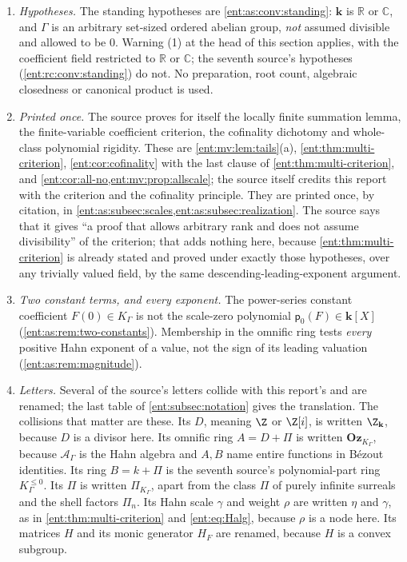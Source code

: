\documentclass[11pt]{article}
\theoremstyle{plain}
\theoremstyle{plain}
\theoremstyle{plain}
\theoremstyle{definition}
\theoremstyle{definition}
\theoremstyle{definition}
\theoremstyle{definition}
\theoremstyle{remark}
\newcommand{\C}{\mathbb C}\newcommand{\R}{\mathbb R}
\newcommand{\K}{K_\Gamma}\newcommand{\KD}{K_\Delta}
\newcommand{\A}{\mathcal A_\Gamma}\newcommand{\OO}{\mathcal O_\Gamma}
\newcommand{\kk}{\mathbf k}\newcommand{\PP}{\mathbb P}
\newcommand{\Oz}{\mathbf{Oz}}\newcommand{\Ed}{\mathcal E_{\Gamma,d}}
\newcommand{\Kle}{K_\Gamma^{\le0}}\DeclareMathOperator{\Jac}{Jac}
\newcommand{\Zk}{\Z_{\kk}}\newcommand{\OzK}{\Oz_{\K}}
\newcommand{\PiK}{\Pi_{\K}}\newcommand{\pg}{\mathsf p}
\begin{document}
\begin{enumerate}[label=(\arabic*),leftmargin=2em]
\item \emph{Hypotheses.} The standing hypotheses are
\cref{ent:as:conv:standing}: $\kk$ is $\R$ or $\C$, and $\Gamma$ is an
arbitrary set-sized ordered abelian group, \emph{not} assumed divisible and
allowed to be $0$. Warning (1) at the head of this section applies, with the
coefficient field restricted to $\R$ or $\C$; the seventh source's hypotheses
(\cref{ent:rc:conv:standing}) do not. No preparation, root count, algebraic
closedness or canonical product is used.
\item \emph{Printed once.} The source proves for itself the locally finite
summation lemma, the finite-variable coefficient criterion, the cofinality
dichotomy and whole-class polynomial rigidity. These are
\cref{ent:mv:lem:tails}(a), \cref{ent:thm:multi-criterion},
\cref{ent:cor:cofinality} with the last clause of
\cref{ent:thm:multi-criterion}, and \cref{ent:cor:all-no,ent:mv:prop:allscale};
the source itself credits this report with the criterion and the cofinality
principle. They are printed once, by citation, in
\cref{ent:as:subsec:scales,ent:as:subsec:realization}. The source says that it
gives ``a proof that allows arbitrary rank and does not assume divisibility''
of the criterion; that adds nothing here, because
\cref{ent:thm:multi-criterion} is already stated and proved under exactly
those hypotheses, over any trivially valued field, by the same
descending-leading-exponent argument.
\item \emph{Two constant terms, and every exponent.} The power-series constant
coefficient $F(0)\in\K$ is not the scale-zero polynomial $\pg_0(F)\in\kk[X]$
(\cref{ent:as:rem:two-constants}). Membership in the omnific ring tests
\emph{every} positive Hahn exponent of a value, not the sign of its leading
valuation (\cref{ent:as:rem:magnitude}).
\item \emph{Letters.} Several of the source's letters collide with this
report's and are renamed; the last table of \cref{ent:subsec:notation} gives
the translation. The collisions that matter are these. Its $D$, meaning $\Z$
or $\Z[i]$, is written $\Zk$, because $D$ is a divisor here. Its omnific ring
$A=D+\Pi$ is written $\OzK$, because $\A$ is the Hahn algebra and $A,B$ name
entire functions in B\'ezout identities. Its ring $B=k+\Pi$ is the seventh
source's polynomial-part ring $\Kle$. Its $\Pi$ is written $\PiK$, apart from
the class $\Pi$ of purely infinite surreals and the shell factors $\Pi_n$. Its
Hahn scale $\gamma$ and weight $\rho$ are written $\eta$ and $\gamma$, as in
\cref{ent:thm:multi-criterion} and \eqref{ent:eq:Halg}, because $\rho$ is a node
here. Its matrices $H$ and its monic generator $H_F$ are renamed, because $H$
is a convex subgroup.
\end{enumerate}
\end{document}
